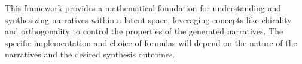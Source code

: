 \documentclass[12pt, a4paper]{article}
\begin{document}
This framework provides a mathematical foundation for understanding and synthesizing narratives within a latent space, leveraging concepts like chirality and orthogonality to control the properties of the generated narratives. The specific implementation and choice of formulas will depend on the nature of the narratives and the desired synthesis outcomes.
\end{document}
